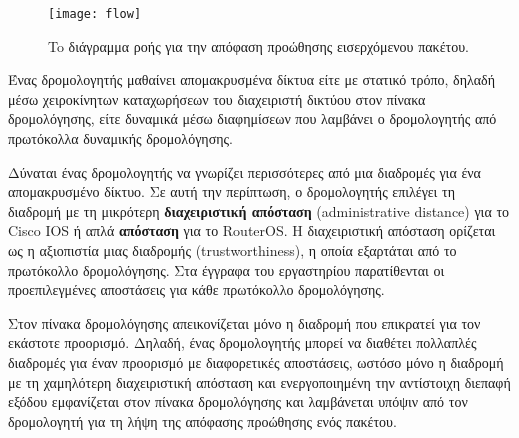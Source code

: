 \documentclass{EdipyLabs} %
\begin{document}
\begin{figure}[ht]
	\centering
	\texttt{[image: flow]}
	\caption{To διάγραμμα ροής για την απόφαση προώθησης εισερχόμενου πακέτου.}\label{fig:flow}
\end{figure}

Ένας δρομολογητής μαθαίνει απομακρυσμένα δίκτυα είτε με στατικό τρόπο, δηλαδή μέσω χειροκίνητων καταχωρήσεων του διαχειριστή δικτύου στον πίνακα δρομολόγησης, είτε δυναμικά μέσω διαφημίσεων που λαμβάνει ο δρομολογητής από πρωτόκολλα δυναμικής δρομολόγησης. 

Δύναται ένας δρομολογητής να γνωρίζει περισσότερες από μια διαδρομές για ένα απομακρυσμένο δίκτυο. Σε αυτή την περίπτωση, ο δρομολογητής επιλέγει τη διαδρομή με τη μικρότερη \textbf{διαχειριστική απόσταση} (administrative distance) για το Cisco IOS ή απλά \textbf{απόσταση} για το RouterOS. Η διαχειριστική απόσταση ορίζεται ως η αξιοπιστία μιας διαδρομής (trustworthiness), η οποία εξαρτάται από το πρωτόκολλο δρομολόγησης. Στα έγγραφα του εργαστηρίου παρατίθενται οι προεπιλεγμένες αποστάσεις για κάθε πρωτόκολλο δρομολόγησης.

Στον πίνακα δρομολόγησης απεικονίζεται μόνο η διαδρομή που επικρατεί για τον εκάστοτε προορισμό. Δηλαδή, ένας δρομολογητής μπορεί να διαθέτει πολλαπλές διαδρομές για έναν προορισμό με διαφορετικές αποστάσεις, ωστόσο μόνο η διαδρομή με τη χαμηλότερη διαχειριστική απόσταση και ενεργοποιημένη την αντίστοιχη διεπαφή εξόδου εμφανίζεται στον πίνακα δρομολόγησης και λαμβάνεται υπόψιν από τον δρομολογητή για τη λήψη της απόφασης προώθησης ενός πακέτου. 
\end{document}

